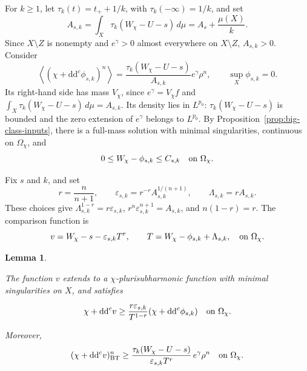 \documentclass[oneside,english,letterpaper]{amsart}
\numberwithin{equation}{section}
\theoremstyle{plain}
\newtheorem{lem}[thm]{Lemma}
\theoremstyle{definition}
\theoremstyle{remark}
\renewcommand{\d}{\mathrm{d}}
\newcommand{\ddc}{\d\d^c}
\begin{document}
For $k\geq1$, let $\tau_k(t)=t_++1/k$, with
$\tau_k(-\infty)=1/k$, and set
\begin{equation}
	\label{eq:auxiliary-normalization}
	A_{s,k}=\int_X\tau_k(W_\chi-U-s)\,d\mu
	=A_s+\frac{\mu(X)}k.
\end{equation}
Since $X\setminus Z$ is nonempty and $e^\gamma>0$ almost everywhere on $X \setminus Z$,
$A_{s,k}>0$. Consider
\begin{equation}
	\label{eq:auxiliary-MA-extended}
	\left\langle(\chi+\ddc\phi_{s,k})^n\right\rangle
	=\frac{\tau_k(W_\chi-U-s)}{A_{s,k}}e^\gamma\rho^n,
	\qquad
	\sup_X\phi_{s,k}=0.
\end{equation}
Its right-hand side has mass $V_\chi$, since $e^\gamma=V_\chi f$ and
$\int_X\tau_k(W_\chi-U-s)\,d\mu=A_{s,k}$. Its density lies in
$L^{p_0}$: $\tau_k(W_\chi-U-s)$ is bounded and the zero extension of
$e^\gamma$ belongs to $L^{p_0}$. By
Proposition~\ref{prop:big-class-inputs}, there is a full-mass solution
with minimal singularities, continuous on $\Omega_\chi$, and
\begin{equation}
	\label{eq:auxiliary-minimal-singularities}
	0\leq W_\chi-\phi_{s,k}\leq C_{s,k}
	\quad\hbox{on }\Omega_\chi.
\end{equation}


Fix $s$ and $k$, and set
\begin{equation}
	\label{eq:epsilon-Lambda}
	r=\frac n{n+1},
	\qquad
	\varepsilon_{s,k}=r^{-r}A_{s,k}^{1/(n+1)},
	\qquad
	\Lambda_{s,k}=rA_{s,k}.
\end{equation}
These choices give
$\Lambda_{s,k}^{1-r}=r\varepsilon_{s,k}$,
$r^n\varepsilon_{s,k}^{n+1}=A_{s,k}$, and $n(1-r)=r$.
The comparison function is
\begin{equation}
	\label{eq:comparison-function}
	v=W_\chi-s-\varepsilon_{s,k} T^r,
	\qquad
	T=W_\chi-\phi_{s,k}+\Lambda_{s,k},
	\quad\hbox{on }\Omega_\chi.
\end{equation}

\begin{lem}

\label{lem:comparison-function-psh}

The function $v$ extends to a $\chi$-plurisubharmonic function
with minimal singularities on $X$, and satisfies

\begin{equation}
\label{eq:comparison-function-lower-bound}
\chi+\ddc v
\geq\frac{r\varepsilon_{s,k}}{T^{1-r}}
(\chi+\ddc\phi_{s,k})
\quad\hbox{on }\Omega_\chi.
\end{equation}


Moreover,
\begin{equation}
\label{eq:comparison-function-MA-lower-bound}
(\chi+\ddc v)^n_{\mathrm{BT}}
\geq
\frac{\tau_k(W_\chi-U-s)}
{\varepsilon_{s,k}T^r}\,e^\gamma\rho^n
\quad\hbox{on }\Omega_\chi.
\end{equation}


\end{lem}
\end{document}
